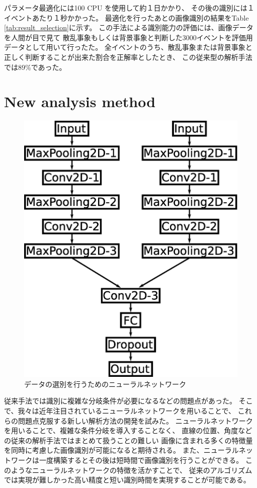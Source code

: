 \documentclass{jps-cp}
\begin{document}
パラメータ最適化には100 CPU を使用して約１日かかり、
その後の識別には１イベントあたり１秒かかった。
最適化を行ったあとの画像識別の結果をTable \ref{tab:result_selection}に示す。
この手法による識別能力の評価には、画像データを人間が目で見て
散乱事象もしくは背景事象と判断した3000イベントを評価用データとして用いて行ったた。
全イベントのうち、散乱事象または背景事象と正しく判断することが出来た割合を正解率としたとき、
この従来型の解析手法では89\%であった。

\section{New analysis method}

\begin{figure}
  \centering
  \includegraphics[clip, width=15zw]{eps/event_selection.eps}
  \caption{データの選別を行うためのニューラルネットワーク}
  \label{fig:selection}
\end{figure}

従来手法では識別に複雑な分岐条件が必要になるなどの問題点があった。
そこで、我々は近年注目されているニューラルネットワークを用いることで、
これらの問題点克服する新しい解析方法の開発を試みた。
ニューラルネットワークを用いることで、複雑な条件分岐を導入することなく、
直線の位置、角度などの従来の解析手法ではまとめて扱うことの難しい
画像に含まれる多くの特徴量を同時に考慮した画像識別が可能になると期待される。
また、ニューラルネットワークは一度構築するとその後は短時間で画像識別を行うことができる。
このようなニューラルネットワークの特徴を活かすことで、
従来のアルゴリズムでは実現が難しかった高い精度と短い識別時間を実現することが可能である。
\end{document}

